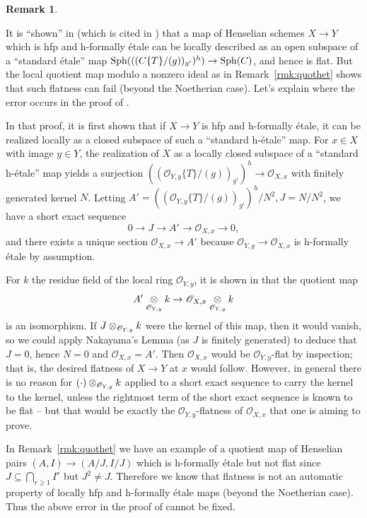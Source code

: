 \documentclass[12pt]{article}
\renewcommand{\O}{\mathscr{O}}
\newcommand{\sph}{{\rm Sph}}
\newcommand{\Et}{\'etale\xspace}
\newcommand{\hfp}{hfp\xspace}
\newcommand{\hetale}{h-\'etale\xspace}
\newcommand{\hfetale}{h-formally \'etale\xspace}
\theoremstyle{definition}
\newtheorem{remark}[theorem]{Remark}
\numberwithin{equation}{subsection}
\begin{document}
\begin{remark}\label{rmk:kprwrong} 


It is ``shown'' in \cite[Satz 3.6.3]{kpr} (which is cited in \cite[Proposition 1]{cox1}) that a map of Henselian schemes $X \to Y$ which is \hfp and \hfetale can be locally described as an open subspace of a ``standard \Et'' map $\sph(((C\{T\}/(g))_{g'})^h) \to \sph(C)$, and hence is flat.  But the local quotient map modulo a nonzero ideal as in Remark~\ref{rmk:quothet} shows that such flatness can fail (beyond the Noetherian case).  Let's explain where the error occurs in the proof of \cite[Satz 3.6.3]{kpr}.

In that proof, it is first shown that if $X \to Y$ is \hfp and \hfetale, it can be realized locally as a closed subspace of such a ``standard \hetale'' map. For $x \in X$ with image $y \in Y$, the realization of $X$ as a locally closed subspace of a ``standard \hetale'' map yields a surjection $((\O_{Y,y}\{T\}/(g))_{g'})^h \to \O_{X,x}$ with finitely generated kernel $N$. Letting $A'=((\O_{Y,y}\{T\}/(g))_{g'})^h/N^2,J=N/N^2$, we have a short exact sequence $$0 \to J \to A' \to \O_{X,x} \to 0,$$ and there exists a unique section $\O_{X,x} \to A'$ because $\O_{Y,y} \to \O_{X,x}$ is \hfetale by assumption.

For $k$ the residue field of the local ring $\O_{Y,y}$, it is shown in \cite{kpr} that the quotient map $$A' \tens_{\O_{Y,y}} k \to \O_{X,x} \tens_{\O_{Y,y}} k$$ is an isomorphism. If $J \tens_{\O_{Y,y}} k$ were the kernel of this map, then it would vanish, so we could apply Nakayama's Lemma (as $J$ is finitely generated) to deduce that $J=0$, hence $N=0$ and $\O_{X,x} = A'$. Then $\O_{X,x}$ would be $\O_{Y,y}$-flat by inspection; that is, the desired flatness of $X \to Y$ at $x$ would follow. However, in general there is no reason for $(\cdot) \tens_{\O_{Y,y}} k$ applied to a short exact sequence to carry the kernel to the kernel, unless the rightmost term of the short exact sequence is known to be flat -- but that would be exactly the $\O_{Y,y}$-flatness of $\O_{X,x}$ that one is aiming to prove.



In Remark~\ref{rmk:quothet} we have an example of a quotient map of Henselian pairs $(A,I) \to (A/J,I/J)$ which is \hfetale but not flat since $J \subseteq \bigcap_{r \ge 1} I^r$ but $J^2 \ne J$. Therefore we know that flatness is not an automatic property of locally \hfp and \hfetale maps (beyond the Noetherian case). Thus the above error in the proof of \cite[Satz 3.6.3]{kpr} cannot be fixed.
\end{remark}
\end{document}
